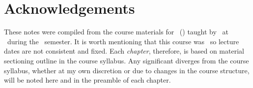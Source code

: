 \chapter*{Acknowledgements}
These notes were compiled from the course materials for \courseNumber\ (\courseTitle) taught by \courseInstructor\, at \universityLong\ during the \courseSemester\ semester. It is worth mentioning that this course was \courseLocation\, so lecture dates are not consistent and fixed. Each \textit{chapter}, therefore, is based on material sectioning outline in the course syllabus. Any significant diverges from the course syllabus, whether at my own discretion or due to changes in the course structure, will be noted here and in the preamble of each chapter.






